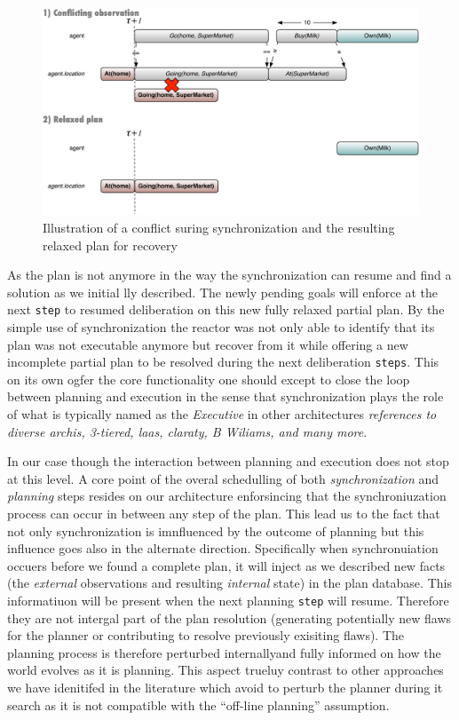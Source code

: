 \begin{figure}[!htbp]
  \centering
  \includegraphics[width=0.7\columnwidth]{figs/shoping_exec_relax}  
  \caption{Illustration of a conflict suring synchronization and the resulting relaxed plan for recovery}
  \label{fig:shop:relax}
\end{figure}

As the plan is not anymore in the way the synchronization can resume 
and find a solution as we initial lly described. The newly pending goals will enforce  at
the next \texttt{step} to resumed deliberation on this new fully
relaxed partial plan. By the simple use of synchronization the reactor 
was not only able to identify that its plan was not executable anymore 
but recover from it while offering a new incomplete partial plan to be
resolved during the next deliberation \texttt{steps}. This on its own
ogfer the core functionality one should except to close the loop
between planning and execution in the sense that synchronization plays
the role of what is typically named as the {\em Executive} in other
architectures {\em\color{red} references to diverse archis, 3-tiered,
  laas, claraty, B Wiliams, and many more}. 

In our case though the interaction between planning and execution
does not stop at this level. A core point of the overal schedulling of
both {\em synchronization} and {\em planning} steps resides on our
architecture enforsincing that the synchroniuzation process can occur
in between any step of the plan. This lead us to the fact that not
only synchronization is imnfluenced by the outcome of planning but
this influence goes also in the alternate direction. Specifically when
synchronuiation occuers before we found a complete plan, it will
inject as we described new facts (the {\em external} observations and
resulting {\em internal} state) in the plan database. This
informatiuon will be present when the next planning \texttt{step} will
resume. Therefore they are not intergal part of the plan resolution
(generating potentially new flaws for the planner or contributing to
resolve previously exisiting flaws). The planning process is therefore
perturbed internallyand fully informed on how the world evolves as it
is planning.  This aspect trueluy contrast to other approaches we have
idenitifed in the literature which avoid to perturb the planner during
it search as it is not compatible with the ``off-line planning'' assumption.

